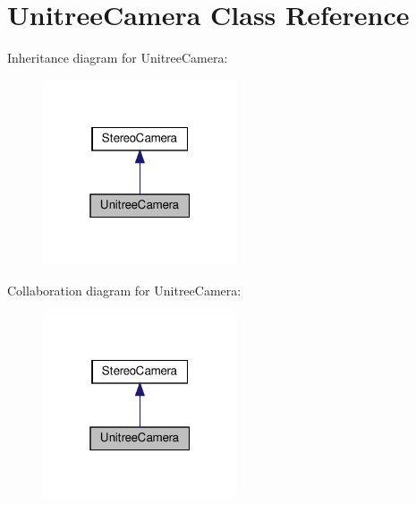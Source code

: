 \hypertarget{class_unitree_camera}{}\section{Unitree\+Camera Class Reference}
\label{class_unitree_camera}


Inheritance diagram for Unitree\+Camera\+:
\nopagebreak
\begin{figure}[H]
\begin{center}
\leavevmode
\includegraphics[width=163pt]{class_unitree_camera__inherit__graph}
\end{center}
\end{figure}


Collaboration diagram for Unitree\+Camera\+:
\nopagebreak
\begin{figure}[H]
\begin{center}
\leavevmode
\includegraphics[width=163pt]{class_unitree_camera__coll__graph}
\end{center}
\end{figure}

